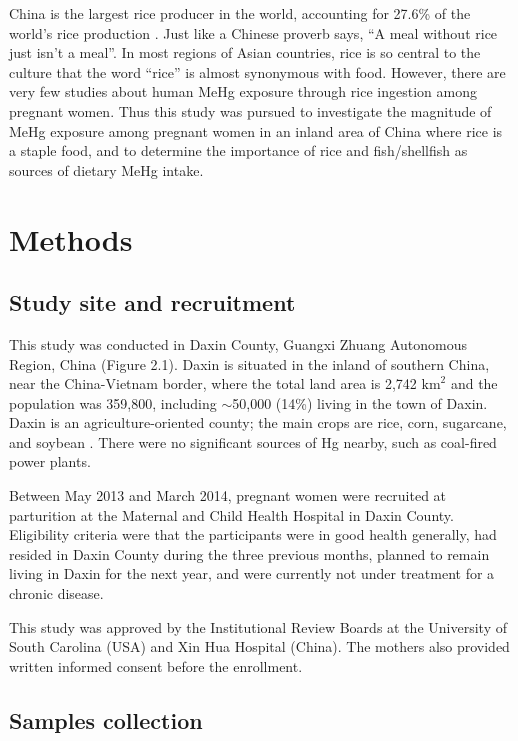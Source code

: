 China is the largest rice producer in the world, accounting for 27.6\% of the world's rice production \citep{fao2016}. Just like a Chinese proverb says, ``A meal without rice just isn't a meal''. In most regions of Asian countries, rice is so central to the culture that the word ``rice'' is almost synonymous with food. However, there are very few studies about human MeHg exposure through rice ingestion among pregnant women. Thus this study was pursued to investigate the magnitude of MeHg exposure among pregnant women in an inland area of China where rice is a staple food, and to determine the importance of rice and fish/shellfish as sources of dietary MeHg intake.

\section{Methods}

\subsection{Study site and recruitment}

This study was conducted in Daxin County, Guangxi Zhuang Autonomous Region, China (Figure 2.1). Daxin is situated in the inland of southern China, near the China-Vietnam border, where the total land area is 2,742 \(\text{km}^{2}\) and the population was 359,800, including \({\sim}\)50,000 (14\%) living in the town of Daxin. Daxin is an agriculture-oriented county; the main crops are rice, corn, sugarcane, and soybean \citep{daxin2016} . There were no significant sources of Hg nearby, such as coal-fired power plants.

Between May 2013 and March 2014, pregnant women were recruited at parturition at the Maternal and Child Health Hospital in Daxin County. Eligibility criteria were that the participants were in good health generally, had resided in Daxin County during the three previous months, planned to remain living in Daxin for the next year, and were currently not under treatment for a chronic disease. 

This study was approved by the Institutional Review Boards at the University of South Carolina (USA) and Xin Hua Hospital (China). The mothers also provided written informed consent before the enrollment. 

\subsection{Samples collection}

